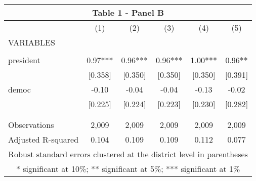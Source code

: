 \begin{tabular}{lccccc}
\multicolumn{6}{c}{Table 1 - Panel B} \\ \hline
 & (1) & (2) & (3) & (4) & (5) \\
VARIABLES &  &  &  &  &  \\ \hline
 &  &  &  &  &  \\
president & 0.97*** & 0.96*** & 0.96*** & 1.00*** & 0.96** \\
 & [0.358] & [0.350] & [0.350] & [0.350] & [0.391] \\
democ & -0.10 & -0.04 & -0.04 & -0.13 & -0.02 \\
 & [0.225] & [0.224] & [0.223] & [0.230] & [0.282] \\
 &  &  &  &  &  \\
 &  &  &  &  &  \\
Observations & 2,009 & 2,009 & 2,009 & 2,009 & 2,009 \\
 Adjusted R-squared & 0.104 & 0.109 & 0.109 & 0.112 & 0.077 \\ \hline
\multicolumn{6}{c}{ Robust standard errors clustered at the district level in parentheses} \\
\multicolumn{6}{c}{ * significant at 10\%; ** significant at 5\%; *** significant at 1\%} \\
\end{tabular}
